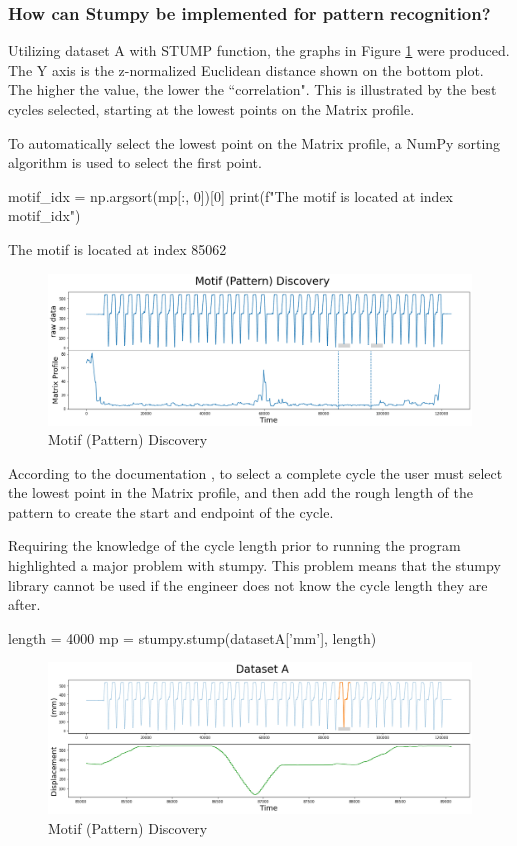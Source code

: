 \subsubsection{How can Stumpy be implemented for pattern recognition?}
Utilizing dataset A with STUMP function, the graphs in Figure \ref{Motif} were produced.
The Y axis is the z-normalized Euclidean distance shown on the bottom plot. The higher the value, the lower the ``correlation". This is illustrated by the best cycles selected, starting at the lowest points on the Matrix profile.

To automatically select the lowest point on the Matrix profile, a NumPy sorting algorithm is used to select the first point.

\begin{python}
motif_idx = np.argsort(mp[:, 0])[0]
print(f"The motif is located at index {motif_idx}")
\end{python}
The motif is located at index 85062

\begin{figure}
\centering
\includegraphics[scale=0.40]{images/Motif (Pattern) Discovery.png}
\caption{Motif (Pattern) Discovery}
\label{Motif}
\end{figure}
According to the documentation \cite{law2019stumpy}, to select a complete cycle the user must select the lowest point in the Matrix profile, and then add the rough length of the pattern to create the start and endpoint of the cycle.

Requiring the knowledge of the cycle length prior to running the program highlighted a major problem with stumpy. This problem means that the stumpy library cannot be used if the engineer does not know the cycle length they are after. 
\begin{python}
length = 4000
mp = stumpy.stump(datasetA['mm'], length)

\end{python}

\begin{figure}
\centering
\includegraphics[scale=0.40]{images/DatasetA.png}
\caption{Motif (Pattern) Discovery}
\label{Stumpy Cycle selected}
\end{figure}

